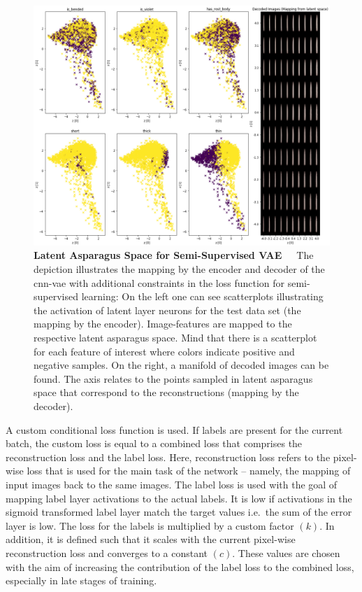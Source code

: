 \begin{figure}[!htb]
    \centering
    \includegraphics[scale=0.35]{Figures/chapter04/semi_supervised_latent_asparagus.png}
    \decoRule
    \caption[Semi-Supervised Convolutional VAE Latent Asparagus Space]{\textbf{Latent Asparagus Space for Semi-Supervised VAE}~~~The depiction illustrates the mapping by the encoder and decoder of the \acrshort{cnn}-\acrshort{vae} with additional constraints in the loss function for semi-supervised learning: On the left one can see scatterplots illustrating the activation of latent layer neurons for the test data set (the mapping by the encoder). Image-features are mapped to the respective latent asparagus space. Mind that there is a scatterplot for each feature of interest where colors indicate positive and negative samples. On the right, a manifold of decoded images can be found. The axis relates to the points sampled in latent asparagus space that correspond to the reconstructions (mapping by the decoder).}
    \label{fig:SemiSupervisedLatentSpace}
\end{figure}

A custom conditional loss function is used. If labels are present for the current batch, the custom loss is equal to a combined loss that comprises the reconstruction loss and the label loss. Here, reconstruction loss refers to the pixel-wise loss that is used for the main task of the network -- namely, the mapping of input images back to the same images. The label loss is used with the goal of mapping label layer activations to the actual labels. It is low if activations in the sigmoid transformed label layer match the target values i.e.\ the sum of the error layer is low. The loss for the labels is multiplied by a custom factor $(k)$. In addition, it is defined such that it scales with the current pixel-wise reconstruction loss and converges to a constant $(c)$. These values are chosen with the aim of increasing the contribution of the label loss to the combined loss, especially in late stages of training.

